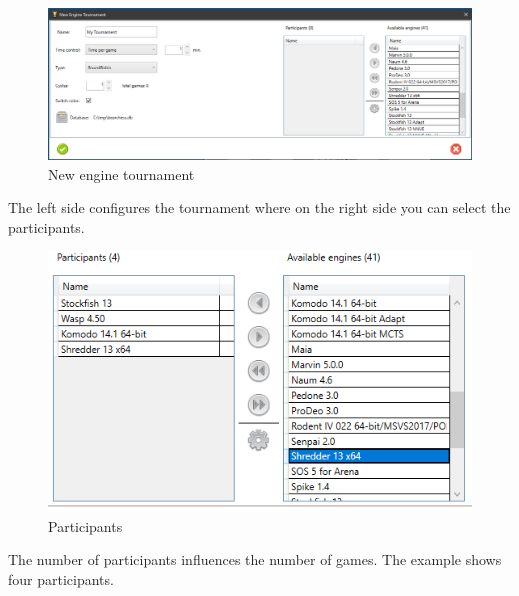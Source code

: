 \documentclass[11pt,a4paper]{article}
\begin{document}
\begin{figure}[H]
	\centering
	\includegraphics[scale=0.4]{EngineTournament1.png}
	\caption{New engine tournament}
	\label{fig:EngineTournament1}
\end{figure}

The left side configures the tournament where on the right side you can select the participants.

\begin{figure}[H]
	\centering
	\includegraphics[scale=0.8]{EngineTournament2.png}
	\caption{Participants}
	\label{fig:EngineTournament2}
\end{figure}
The number of participants influences the number of games. The example shows four participants.
\end{document}
